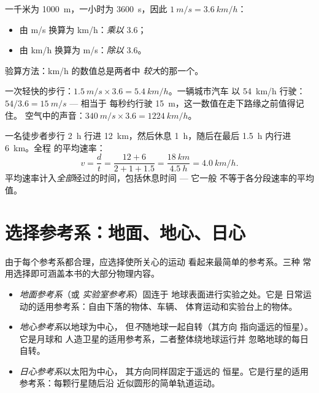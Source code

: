 \begin{method}[米每秒与千米每小时之间的换算]\label{met:g10:relative-motion:convert}
一千米为 \qty{1000}{m}，一小时为 \qty{3600}{s}，因此
$\qty{1}{m/s} = \qty{3.6}{km/h}$：
\begin{itemize}
  \item 由 \unit{m/s} 换算为 \unit{km/h}：\emph{乘以} $3.6$；
  \item 由 \unit{km/h} 换算为 \unit{m/s}：\emph{除以} $3.6$。
\end{itemize}
验算方法：\unit{km/h} 的数值总是两者中
\emph{较大}的那一个。
\end{method}

\begin{example}[几个值得了解的速率]\label{ex:g10:relative-motion:convert}
一次轻快的步行：$\qty{1.5}{m/s} \times 3.6 = \qty{5.4}{km/h}$。一辆城市汽车
以 \qty{54}{km/h} 行驶：$54 / 3.6 = \qty{15}{m/s}$ --- 相当于
每秒约行驶 \qty{15}{m}，这一数值在走下路缘之前值得记住。
空气中的声音：$\qty{340}{m/s} \times 3.6 = \qty{1224}{km/h}$。
\end{example}

\begin{example}[中途休息的徒步]\label{ex:g10:relative-motion:hike}
一名徒步者步行 \qty{2}{h} 行进 \qty{12}{km}，然后休息
\qty{1}{h}，随后在最后 \qty{1.5}{h} 内行进 \qty{6}{km}。全程
的平均速率：
\[
v = \frac{d}{t} = \frac{12 + 6}{2 + 1 + 1.5}
= \frac{\qty{18}{km}}{\qty{4.5}{h}} = \qty{4.0}{km/h}.
\]
平均速率计入\emph{全部}经过的时间，包括休息时间 --- 它一般
不等于各分段速率的平均值。
\end{example}

\section{选择参考系：地面、地心、日心}

由于每个参考系都合理，应选择使所关心的运动
看起来最简单的参考系。三种
常用选择即可涵盖本书的大部分物理内容。

\begin{definition}[三种标准参考系]\label{def:g10:relative-motion:frames}
\begin{itemize}
  \item \emph{地面参考系}（或
        \emph{实验室参考系}）固连于
        地球表面进行实验之处。它是
        日常运动的适用参考系：自由下落的物体、车辆、
        体育运动和实验台上的物体。
  \item \emph{地心参考系}以地球为中心，
        但\emph{不}随地球一起自转（其方向
        指向遥远的恒星）。它是月球和
        人造卫星的适用参考系，二者整体绕地球运行并
        忽略地球的每日自转。
  \item \emph{日心参考系}以太阳为中心，
        其方向同样固定于遥远的
        恒星。它是行星的适用参考系：每颗行星随后沿
        近似圆形的简单轨道运动。
\end{itemize}
\end{definition}

